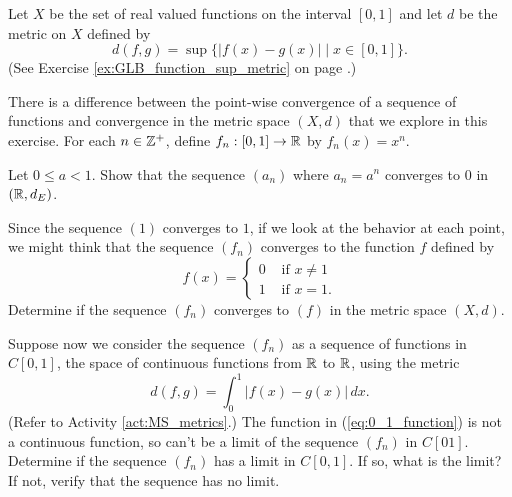 \item Let $X$ be the set of real valued functions on the interval $[0,1]$ and let $d$ be the metric on $X$ defined by 
\[d(f,g) = \sup\{|f(x)-g(x)| \mid x \in [0,1]\}.\]
(See Exercise \ref{ex:GLB_function_sup_metric} on page \pageref{ex:GLB_function_sup_metric}.)

There is a difference between the point-wise convergence of a sequence of functions and convergence in the metric space $(X,d)$ that we explore in this exercise. For each $n \in \mathbb{Z}^+$, define $f_n :[0,1] \to \mathbb{R}$ by $f_n(x) = x^n$. 

\ba

\item Let $0 \leq a < 1$. Show that the sequence $(a_n)$ where $a_n = a^n$ converges to $0$ in $(\mathbb{R}, d_E)$. 

\item Since the sequence $(1)$ converges to $1$, if we look at the behavior at each point, we might think that the sequence $(f_n)$ converges to the function $f$ defined by 
\begin{equation} \label{eq:0_1_function}
f(x) = \begin{cases} 0 &\text{ if } x \neq 1 \\ 1 &\text{ if } x=1. \end{cases}
\end{equation}
Determine if the sequence $(f_n)$ converges to $(f)$ in the metric space $(X,d)$.

\item Suppose now we consider the sequence $(f_n)$ as a sequence of functions in $C[0,1]$, the space of continuous functions from $\mathbb{R}$ to $\mathbb{R}$, using the metric
\[d(f,g) = \int_0^1 |f(x) - g(x)| \,dx.\]
(Refer to Activity \ref{act:MS_metrics}.) The function in (\ref{eq:0_1_function}) is not a continuous function, so can't be a limit of the sequence $(f_n)$ in $C[01]$. Determine if the sequence $(f_n)$ has a limit in $C[0,1]$. If so, what is the limit? If not, verify that the sequence has no limit. 

\ea

